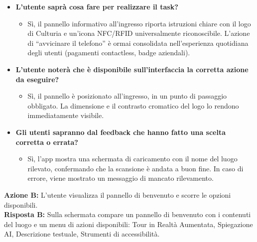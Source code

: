 \begin{itemize}[nosep, leftmargin=1.6em]
    \item \textbf{L'utente saprà cosa fare per realizzare il task?}
    \begin{itemize}[nosep, leftmargin=1.6em]
        \item Sì, il pannello informativo all'ingresso riporta istruzioni chiare con il logo di Culturia e un'icona NFC/RFID universalmente riconoscibile. L'azione di ``avvicinare il telefono'' è ormai consolidata nell'esperienza quotidiana degli utenti (pagamenti contactless, badge aziendali).
    \end{itemize}
    \item \textbf{L'utente noterà che è disponibile sull'interfaccia la corretta azione da eseguire?}
    \begin{itemize}[nosep, leftmargin=1.6em]
        \item Sì, il pannello è posizionato all'ingresso, in un punto di passaggio obbligato. La dimensione e il contrasto cromatico del logo lo rendono immediatamente visibile.
    \end{itemize}
    \item \textbf{Gli utenti sapranno dal feedback che hanno fatto una scelta corretta o errata?}
    \begin{itemize}[nosep, leftmargin=1.6em]
        \item Sì, l'app mostra una schermata di caricamento con il nome del luogo rilevato, confermando che la scansione è andata a buon fine. In caso di errore, viene mostrato un messaggio di mancato rilevamento.
    \end{itemize}
\end{itemize}

\vspace{0.3cm}
\noindent\textbf{Azione B:} L'utente visualizza il pannello di benvenuto e scorre le opzioni disponibili.\\
\textbf{Risposta B:} Sulla schermata compare un pannello di benvenuto con i contenuti del luogo e un menu di azioni disponibili: Tour in Realtà Aumentata, Spiegazione AI, Descrizione testuale, Strumenti di accessibilità.

